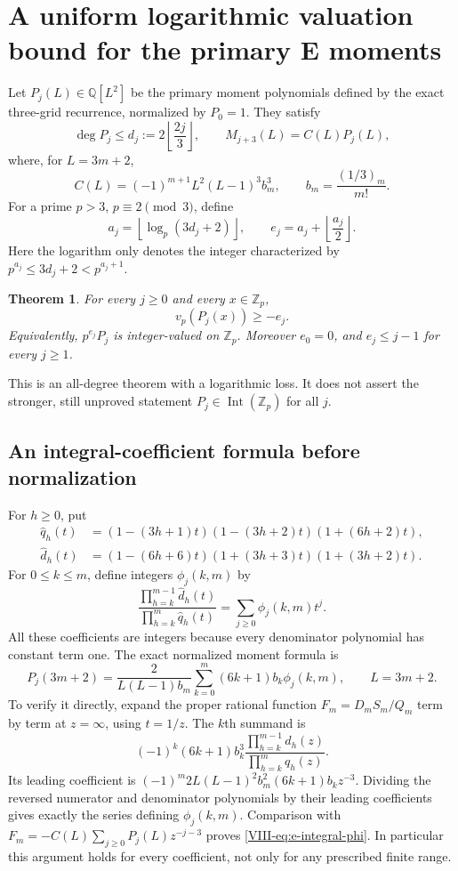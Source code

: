 \documentclass[11pt,letterpaper]{article}
\newtheorem{theorem}{Theorem}[section]
\numberwithin{equation}{section}
\begin{document}
\section{A uniform logarithmic valuation bound for the primary E moments}\label{loc-VIII-5}
\label{VIII-sec:e-uniform-log-bound}
Let $P_j(L)\in\mathbb Q[L^2]$ be the primary moment polynomials defined
by the exact three-grid recurrence, normalized by $P_0=1$. They satisfy
\[
 \deg P_j\le d_j:=2\left\lfloor\frac{2j}{3}\right\rfloor,
 \qquad M_{j+3}(L)=C(L)P_j(L),
\]
where, for $L=3m+2$,
\[
 C(L)=(-1)^{m+1}L^2(L-1)^3b_m^3,\qquad b_m=\frac{(1/3)_m}{m!}.
\]
For a prime $p>3$, $p\equiv2\pmod3$, define
\[
 a_j=\left\lfloor\log_p(3d_j+2)\right\rfloor,
 \qquad e_j=a_j+\left\lfloor\frac{a_j}{2}\right\rfloor.
\]
Here the logarithm only denotes the integer characterized by
$p^{a_j}\le3d_j+2<p^{a_j+1}$.

\begin{theorem}\label{VIII-thm:e-log-bound}
For every $j\ge0$ and every $x\in\mathbb Z_p$,
\[
 \boxed{v_p(P_j(x))\ge-e_j.}
\]
Equivalently, $p^{e_j}P_j$ is integer-valued on $\mathbb Z_p$.
Moreover $e_0=0$, and $e_j\le j-1$ for every $j\ge1$.
\end{theorem}
This is an all-degree theorem with a logarithmic loss. It does not
assert the stronger, still unproved statement
$P_j\in\operatorname{Int}(\mathbb Z_p)$ for all $j$.

\subsection{An integral-coefficient formula before normalization}
For $h\ge0$, put
\begin{align*}
 \widehat q_h(t)&=(1-(3h+1)t)(1-(3h+2)t)(1+(6h+2)t),\\
 \widehat d_h(t)&=(1-(6h+6)t)(1+(3h+3)t)(1+(3h+2)t).
\end{align*}
For $0\le k\le m$, define integers $\phi_j(k,m)$ by
\[
 \frac{\prod_{h=k}^{m-1}\widehat d_h(t)}
      {\prod_{h=k}^{m}\widehat q_h(t)}
 =\sum_{j\ge0}\phi_j(k,m)t^j.
\]
All these coefficients are integers because every denominator
polynomial has constant term one. The exact normalized moment formula is
\begin{equation}\label{VIII-eq:e-integral-phi}
 P_j(3m+2)=\frac{2}{L(L-1)b_m}
          \sum_{k=0}^m(6k+1)b_k\phi_j(k,m),\qquad L=3m+2.
\end{equation}
To verify it directly, expand the proper rational function
$F_m=D_mS_m/Q_m$ term by term at $z=\infty$, using $t=1/z$.
The $k$th summand is
\[
 (-1)^k(6k+1)b_k^3
 \frac{\prod_{h=k}^{m-1}d_h(z)}{\prod_{h=k}^{m}q_h(z)}.
\]
Its leading coefficient is
$(-1)^m2L(L-1)^2b_m^2(6k+1)b_kz^{-3}$.
Dividing the reversed numerator and denominator polynomials by
their leading coefficients gives exactly the series defining
$\phi_j(k,m)$. Comparison with
$F_m=-C(L)\sum_{j\ge0}P_j(L)z^{-j-3}$ proves
\eqref{VIII-eq:e-integral-phi}. In particular this argument holds for
every coefficient, not only for any prescribed finite range.
\end{document}
